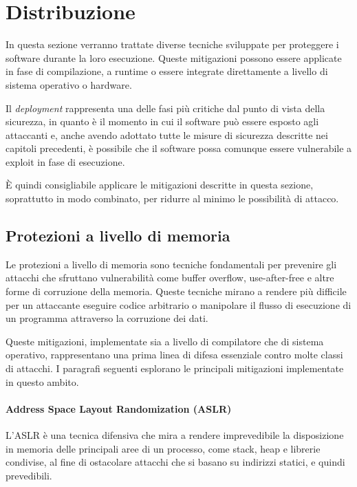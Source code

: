 \section{Distribuzione}
\label{sec:deployment}

In questa sezione verranno trattate diverse tecniche sviluppate per proteggere i
software durante la loro esecuzione. Queste mitigazioni possono essere applicate
in fase di compilazione, a runtime o essere integrate direttamente a livello di sistema
operativo o hardware.

Il \textit{deployment} rappresenta una delle fasi più critiche dal punto di
vista della sicurezza, in quanto è il momento in cui il software può essere esposto
agli attaccanti e, anche avendo adottato tutte le misure di sicurezza descritte
nei capitoli precedenti, è possibile che il software possa comunque essere vulnerabile
a exploit in fase di esecuzione.

È quindi consigliabile applicare le mitigazioni descritte in questa sezione,
soprattutto in modo combinato, per ridurre al minimo le possibilità di attacco.

\subsection{Protezioni a livello di memoria}
\label{sec:memory-protection}

Le protezioni a livello di memoria sono tecniche fondamentali per prevenire gli
attacchi che sfruttano vulnerabilità come buffer overflow, use-after-free e altre
forme di corruzione della memoria. Queste tecniche mirano a rendere più
difficile per un attaccante eseguire codice arbitrario o manipolare il flusso di
esecuzione di un programma attraverso la corruzione dei dati.

Queste mitigazioni, implementate sia a livello di compilatore che di sistema operativo,
rappresentano una prima linea di difesa essenziale contro molte classi di
attacchi. I paragrafi seguenti esplorano le principali mitigazioni implementate in
questo ambito.

\paragraph{Address Space Layout Randomization (ASLR)}
L'ASLR è una tecnica difensiva che mira a rendere imprevedibile la disposizione
in memoria delle principali aree di un processo, come stack, heap e librerie
condivise, al fine di ostacolare attacchi che si basano su indirizzi statici, e
quindi prevedibili.

